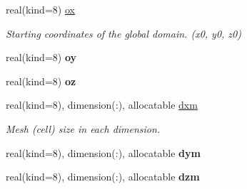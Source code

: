 \textbf{ }\par
\begin{DoxyCompactItemize}
\item 
\mbox{\label{structgeometry_1_1domain_aecb690de419cdff12180b6c73aa87daf}} 
real(kind=8) \hyperlink{structgeometry_1_1domain_aecb690de419cdff12180b6c73aa87daf}{ox}
\begin{DoxyCompactList}\small\item\em Starting coordinates of the global domain. (x0, y0, z0) \end{DoxyCompactList}\item 
\mbox{\label{structgeometry_1_1domain_a1e4a155922f64d3b2f95efbb93cfa570}} 
real(kind=8) {\bfseries oy}
\item 
\mbox{\label{structgeometry_1_1domain_acdd00f08acd1037a5b4eff090c3a19d1}} 
real(kind=8) {\bfseries oz}
\end{DoxyCompactItemize}

\textbf{ }\par
\begin{DoxyCompactItemize}
\item 
\mbox{\label{structgeometry_1_1domain_a51f16943b22e5acab127f91248fca50b}} 
real(kind=8), dimension(\+:), allocatable \hyperlink{structgeometry_1_1domain_a51f16943b22e5acab127f91248fca50b}{dxm}
\begin{DoxyCompactList}\small\item\em Mesh (cell) size in each dimension. \end{DoxyCompactList}\item 
\mbox{\label{structgeometry_1_1domain_a6e0e0af9dca8a54dfe4d5aab0e85ba75}} 
real(kind=8), dimension(\+:), allocatable {\bfseries dym}
\item 
\mbox{\label{structgeometry_1_1domain_ae33cc4a55efbe7f1dc0eded6c73aa4b3}} 
real(kind=8), dimension(\+:), allocatable {\bfseries dzm}
\end{DoxyCompactItemize}


